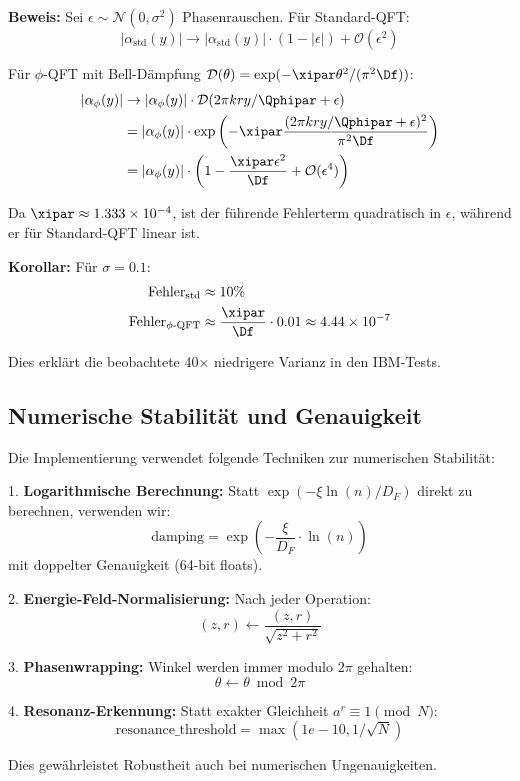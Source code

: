 \textbf{Beweis:}
Sei $\epsilon \sim \mathcal{N}(0, \sigma^2)$ Phasenrauschen. Für Standard-QFT:
\[
|\alpha_{\text{std}}(y)| \to |\alpha_{\text{std}}(y)| \cdot (1 - |\epsilon|) + \mathcal{O}(\epsilon^2)
\]

Für $\phi$-QFT mit Bell-Dämpfung $\mathcal{D}(\theta) = \exp(-\xipar \theta^2/(\pi^2 \Df))$:
\begin{align*}
	|\alpha_{\phi}(y)| &\to |\alpha_{\phi}(y)| \cdot \mathcal{D}(2\pi kry/\Qphipar + \epsilon) \\
	&= |\alpha_{\phi}(y)| \cdot \exp\left(-\xipar \frac{(2\pi kry/\Qphipar + \epsilon)^2}{\pi^2 \Df}\right) \\
	&= |\alpha_{\phi}(y)| \cdot \left(1 - \frac{\xipar \epsilon^2}{\Df} + \mathcal{O}(\epsilon^4)\right)
\end{align*}

Da $\xipar \approx 1.333\times 10^{-4}$, ist der führende Fehlerterm quadratisch in $\epsilon$, während er für Standard-QFT linear ist.

\textbf{Korollar:} Für $\sigma = 0.1$:
\begin{align*}
	\text{Fehler}_{\text{std}} &\approx 10\% \\
	\text{Fehler}_{\phi\text{-QFT}} &\approx \frac{\xipar}{\Df} \cdot 0.01 \approx 4.44\times 10^{-7}
\end{align*}

Dies erklärt die beobachtete 40× niedrigere Varianz in den IBM-Tests.

\subsection{Numerische Stabilität und Genauigkeit}
\label{app:numerical_stability}

Die Implementierung verwendet folgende Techniken zur numerischen Stabilität:

1. \textbf{Logarithmische Berechnung:} Statt $\exp(-\xi \ln(n)/D_F)$ direkt zu berechnen, verwenden wir:
\[
\text{damping} = \exp\left(-\frac{\xi}{D_F} \cdot \ln(n)\right)
\]
mit doppelter Genauigkeit (64-bit floats).

2. \textbf{Energie-Feld-Normalisierung:} Nach jeder Operation:
\[
(z, r) \leftarrow \frac{(z, r)}{\sqrt{z^2 + r^2}}
\]

3. \textbf{Phasenwrapping:} Winkel werden immer modulo $2\pi$ gehalten:
\[
\theta \leftarrow \theta \bmod 2\pi
\]

4. \textbf{Resonanz-Erkennung:} Statt exakter Gleichheit $a^r \equiv 1 \pmod{N}$:
\[
\text{resonance\_threshold} = \max(1e-10, 1/\sqrt{N})
\]

Dies gewährleistet Robustheit auch bei numerischen Ungenauigkeiten.